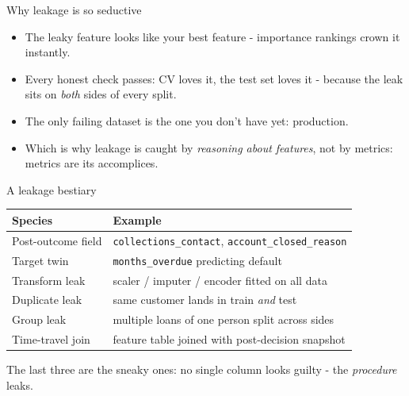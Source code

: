 \documentclass[10pt,aspectratio=169]{beamer}
\begin{document}
\begin{frame}{Why leakage is so seductive}
  \begin{itemize}
    \item The leaky feature looks like your \alert{best feature} -
          importance rankings crown it instantly.
    \item Every honest check passes: CV loves it, the test set loves it
          - because the leak sits on \emph{both} sides of every split.
    \item The only failing dataset is the one you don't have yet:
          \alert{production}.
    \item Which is why leakage is caught by \emph{reasoning about features},
          not by metrics: metrics are its accomplices.
  \end{itemize}
\end{frame}

\begin{frame}{A leakage bestiary}
  \small
  \begin{center}
  \begin{tabular}{@{}lp{6.4cm}@{}}
    \toprule
    Species & Example \\
    \midrule
    Post-outcome field & \texttt{collections\_contact}, \texttt{account\_closed\_reason} \\
    Target twin & \texttt{months\_overdue} predicting default \\
    Transform leak & scaler / imputer / encoder fitted on all data \\
    Duplicate leak & same customer lands in train \emph{and} test \\
    Group leak & multiple loans of one person split across sides \\
    Time-travel join & feature table joined with post-decision snapshot \\
    \bottomrule
  \end{tabular}
  \end{center}
  \vspace{0.4em}
  \begin{center}\small
    The last three are the sneaky ones: no single column looks guilty -
    the \emph{procedure} leaks.
  \end{center}
\end{frame}
\end{document}
